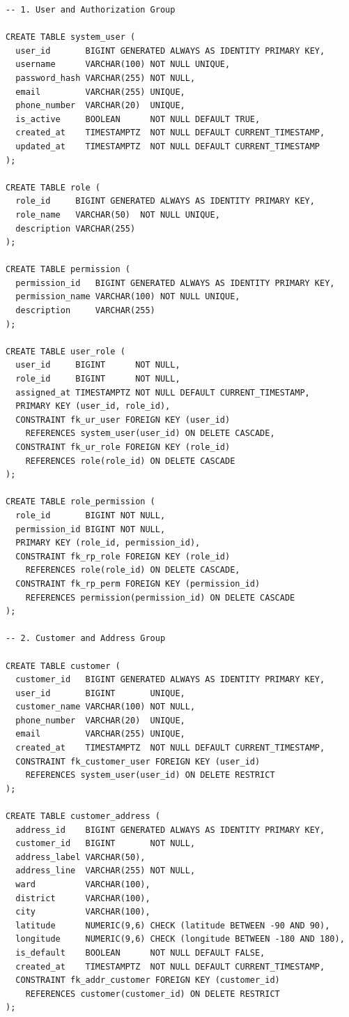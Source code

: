 \begin{verbatim}
-- 1. User and Authorization Group

CREATE TABLE system_user (
  user_id       BIGINT GENERATED ALWAYS AS IDENTITY PRIMARY KEY,
  username      VARCHAR(100) NOT NULL UNIQUE,
  password_hash VARCHAR(255) NOT NULL,
  email         VARCHAR(255) UNIQUE,
  phone_number  VARCHAR(20)  UNIQUE,
  is_active     BOOLEAN      NOT NULL DEFAULT TRUE,
  created_at    TIMESTAMPTZ  NOT NULL DEFAULT CURRENT_TIMESTAMP,
  updated_at    TIMESTAMPTZ  NOT NULL DEFAULT CURRENT_TIMESTAMP
);

CREATE TABLE role (
  role_id     BIGINT GENERATED ALWAYS AS IDENTITY PRIMARY KEY,
  role_name   VARCHAR(50)  NOT NULL UNIQUE,
  description VARCHAR(255)
);

CREATE TABLE permission (
  permission_id   BIGINT GENERATED ALWAYS AS IDENTITY PRIMARY KEY,
  permission_name VARCHAR(100) NOT NULL UNIQUE,
  description     VARCHAR(255)
);

CREATE TABLE user_role (
  user_id     BIGINT      NOT NULL,
  role_id     BIGINT      NOT NULL,
  assigned_at TIMESTAMPTZ NOT NULL DEFAULT CURRENT_TIMESTAMP,
  PRIMARY KEY (user_id, role_id),
  CONSTRAINT fk_ur_user FOREIGN KEY (user_id)
    REFERENCES system_user(user_id) ON DELETE CASCADE,
  CONSTRAINT fk_ur_role FOREIGN KEY (role_id)
    REFERENCES role(role_id) ON DELETE CASCADE
);

CREATE TABLE role_permission (
  role_id       BIGINT NOT NULL,
  permission_id BIGINT NOT NULL,
  PRIMARY KEY (role_id, permission_id),
  CONSTRAINT fk_rp_role FOREIGN KEY (role_id)
    REFERENCES role(role_id) ON DELETE CASCADE,
  CONSTRAINT fk_rp_perm FOREIGN KEY (permission_id)
    REFERENCES permission(permission_id) ON DELETE CASCADE
);

-- 2. Customer and Address Group

CREATE TABLE customer (
  customer_id   BIGINT GENERATED ALWAYS AS IDENTITY PRIMARY KEY,
  user_id       BIGINT       UNIQUE,
  customer_name VARCHAR(100) NOT NULL,
  phone_number  VARCHAR(20)  UNIQUE,
  email         VARCHAR(255) UNIQUE,
  created_at    TIMESTAMPTZ  NOT NULL DEFAULT CURRENT_TIMESTAMP,
  CONSTRAINT fk_customer_user FOREIGN KEY (user_id)
    REFERENCES system_user(user_id) ON DELETE RESTRICT
);

CREATE TABLE customer_address (
  address_id    BIGINT GENERATED ALWAYS AS IDENTITY PRIMARY KEY,
  customer_id   BIGINT       NOT NULL,
  address_label VARCHAR(50),
  address_line  VARCHAR(255) NOT NULL,
  ward          VARCHAR(100),
  district      VARCHAR(100),
  city          VARCHAR(100),
  latitude      NUMERIC(9,6) CHECK (latitude BETWEEN -90 AND 90),
  longitude     NUMERIC(9,6) CHECK (longitude BETWEEN -180 AND 180),
  is_default    BOOLEAN      NOT NULL DEFAULT FALSE,
  created_at    TIMESTAMPTZ  NOT NULL DEFAULT CURRENT_TIMESTAMP,
  CONSTRAINT fk_addr_customer FOREIGN KEY (customer_id)
    REFERENCES customer(customer_id) ON DELETE RESTRICT
);


\end{verbatim}
